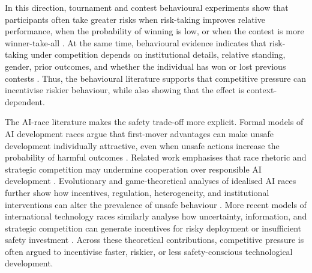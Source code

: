 \documentclass[pdflatex,sn-mathphys-ay]{sn-jnl}
\theoremstyle{thmstyleone}
\theoremstyle{thmstyletwo}
\theoremstyle{thmstylethree}
\begin{document}
In this direction, tournament and contest behavioural experiments show that participants often take greater risks when risk-taking improves relative performance, when the probability of winning is low, or when the contest is more winner-take-all \citep{BullSchotterWeigelt1987TournamentsPieceRates,NiekenSliwka2010RiskTakingTournaments,EriksenKvaloy2014MyopicRiskTaking,SchedlinskySommerWoehrmann2016RiskTakingTournaments,Spadoni2018CompetitionRiskTakingContests,GuertlerStruthThon2023CompetitionRiskTaking}. At the same time, behavioural evidence indicates that risk-taking under competition depends on institutional details, relative standing, gender, prior outcomes, and whether the individual has won or lost previous contests \citep{FilippinGioia2018CompetitionSubsequentRiskTaking,GenakosPagliero2012InterimRankRiskTaking}. Thus, the behavioural literature supports that competitive pressure can incentivise riskier behaviour, while also showing that the effect is context-dependent.

The AI-race literature makes the safety trade-off more explicit. Formal models of AI development races argue that first-mover advantages can make unsafe development individually attractive, even when unsafe actions increase the probability of harmful outcomes \citep{ArmstrongBostromShulman2016RacingPrecipice,han2020toRegulateOrNot}. Related work emphasises that race rhetoric and strategic competition may undermine cooperation over responsible AI development \citep{CaveOHeigeartaigh2018AIRace,AskellBrundageHadfield2019CooperationResponsibleAI,BarnettScher2025AIGovernanceExtinction}. Evolutionary and game-theoretical analyses of idealised AI races further show how incentives, regulation, heterogeneity, and institutional interventions can alter the prevalence of unsafe behaviour \citep{HanEtAl2021MediatingAI,han2022voluntary,CimpeanuEtAl2022AIRacesHeterogeneous}. More recent models of international technology races similarly analyse how uncertainty, information, and strategic competition can generate incentives for risky deployment or insufficient safety investment \citep{StaffordTragerDafoe2022SafetyNotGuaranteed,EmeryXuParkTrager2024TechnologyRaces,Polborn2025CompetitiveDevelopmentDangerousTechnologies,BuenoDeMesquitaDziudaPolborn2026AGIRace}. Across these theoretical contributions, competitive pressure is often argued to incentivise faster, riskier, or less safety-conscious technological development.
\end{document}
